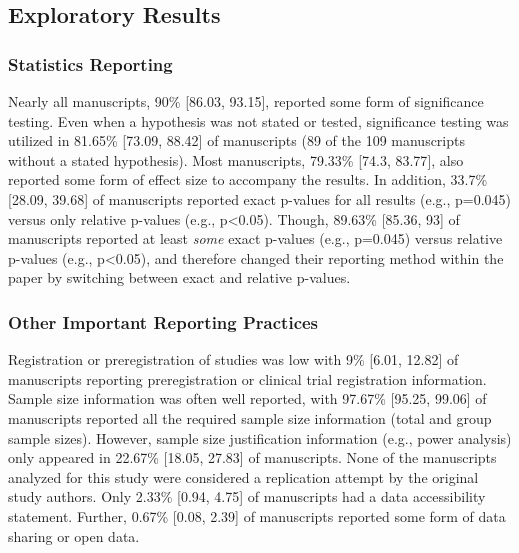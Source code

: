 \documentclass[]{cik}%
\begin{document}
\newpage

\hypertarget{exploratory-results}{%
\subsection{Exploratory Results}\label{exploratory-results}}

\hypertarget{statistics-reporting}{%
\subsubsection{Statistics Reporting}\label{statistics-reporting}}

Nearly all manuscripts, 90\% {[}86.03, 93.15{]}, reported some form of
significance testing. Even when a hypothesis was not stated or tested,
significance testing was utilized in 81.65\% {[}73.09, 88.42{]} of
manuscripts (89 of the 109 manuscripts without a stated hypothesis).
Most manuscripts, 79.33\% {[}74.3, 83.77{]}, also reported some form of
effect size to accompany the results. In addition, 33.7\% {[}28.09,
39.68{]} of manuscripts reported exact p-values for all results (e.g.,
p=0.045) versus only relative p-values (e.g., p\textless0.05). Though,
89.63\% {[}85.36, 93{]} of manuscripts reported at least \emph{some}
exact p-values (e.g., p=0.045) versus relative p-values (e.g.,
p\textless0.05), and therefore changed their reporting method within the
paper by switching between exact and relative p-values.

\hypertarget{other-important-reporting-practices}{%
\subsubsection{Other Important Reporting
Practices}\label{other-important-reporting-practices}}

Registration or preregistration of studies was low with 9\% {[}6.01,
12.82{]} of manuscripts reporting preregistration or clinical trial
registration information. Sample size information was often well
reported, with 97.67\% {[}95.25, 99.06{]} of manuscripts reported all
the required sample size information (total and group sample sizes).
However, sample size justification information (e.g., power analysis)
only appeared in 22.67\% {[}18.05, 27.83{]} of manuscripts. None of the
manuscripts analyzed for this study were considered a replication
attempt by the original study authors. Only 2.33\% {[}0.94, 4.75{]} of
manuscripts had a data accessibility statement. Further, 0.67\% {[}0.08,
2.39{]} of manuscripts reported some form of data sharing or open data.
\end{document}
